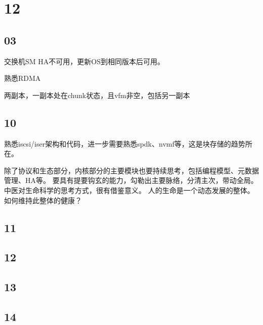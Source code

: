 \section{12}

\subsection{03}

交换机SM HA不可用，更新OS到相同版本后可用。

熟悉RDMA

两副本，一副本处在chunk状态，且vfm非空，包括另一副本

\subsection{10}

熟悉iscsi/iser架构和代码，进一步需要熟悉spdk、nvmf等，这是块存储的趋势所在。

除了协议和生态部分，内核部分的主要模块也要持续思考，包括编程模型、元数据管理、HA等。
要具有提要钩玄的能力，勾勒出主要脉络，分清主次，带动全局。中医对生命科学的思考方式，很有借鉴意义。
人的生命是一个动态发展的整体。如何维持此整体的健康？

\subsection{11}

\subsection{12}

\subsection{13}

\subsection{14}
